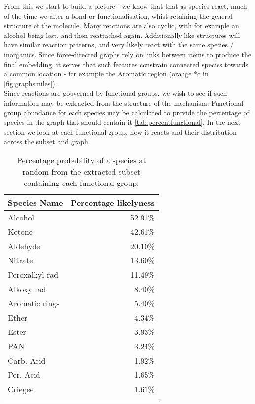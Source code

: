 

From this we start to build a picture - we know that that as species react, much of the time we alter a bond or functionalisation, whist retaining the general structure of the molecule. Many reactions are also cyclic, with for example an alcohol being lost, and then reattached again. Additionally like structures will have similar reaction patterns, and very likely react with the same species / inorganics. Since force-directed graphs rely on links between items to produce the final embedding, it serves that such features constrain connected species towards a common location - for example the Aromatic region (orange *c in \autoref{fig:graphsmiles}).\\

Since reactions are gouverned by functional groups, we wish to see if such information may be extracted from the structure of the mechanism. Functional group abundance for each species may be calculated to provide the percentage of species in the graph that should contain it \autoref{tab:percentfunctional}. In the next section we look at each functional group, how it reacts and their distribution across the subset and graph.

\begin{table}
\begin{tabular}{lr}
\toprule
Species Name &  Percentage likelyness \\ \midrule

Alcohol        &   52.91\% \\
Ketone         &   42.61\% \\
Aldehyde       &   20.10\% \\
Nitrate        &   13.60\% \\
Peroxalkyl rad &   11.49\% \\
Alkoxy rad     &    8.40\% \\
Aromatic rings &    5.40\% \\
Ether          &    4.34\% \\
Ester          &    3.93\% \\
PAN            &    3.24\% \\
Carb. Acid     &    1.92\% \\
Per. Acid      &    1.65\% \\
Criegee        &    1.61\% \\
\bottomrule \\
\end{tabular}

    \label{tab:percentfunctional}
    \caption{Percentage probability of a species at random from the extracted subset containing each functional group. }
\end{table}




